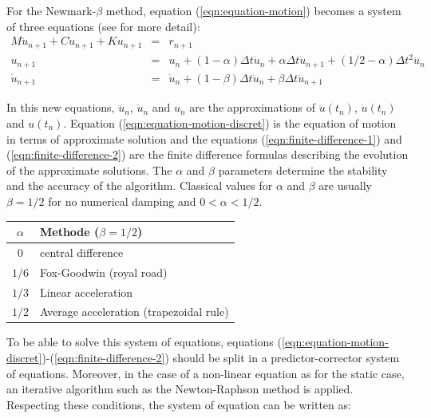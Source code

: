 \documentclass[a4paper,11pt]{book}
\begin{document}
For the  Newmark-$\beta$ method, equation  (\ref{eqn:equation-motion}) becomes a
system  of three  equations  (see \cite{curnier92a}  \cite{hughes-83a} for  more
detail):
\begin{eqnarray}
  M     \ddot{u}_{n+1}    +     C    \dot{u}_{n+1}     +    K     u_{n+1}    &=&
  r_{n+1} \label{eqn:equation-motion-discret} \\
  u_{n+1}  &=& u_{n}  + (1  - \alpha)  \Delta t  \dot{u}_{n} +  \alpha  \Delta t
  \dot{u}_{n+1}       +       (1/2        -       \alpha)       \Delta       t^2
  \ddot{u}_n \label{eqn:finite-difference-1}\\
  \dot{u}_{n+1}  &=& \dot{u}_{n} +  (1 -  \beta) \Delta  t \ddot{u}_{n}  + \beta
  \Delta t \ddot{u}_{n+1}\label{eqn:finite-difference-2}
\end{eqnarray}

In   this  new   equations,  $\ddot{u}_n$,   $\dot{u}_n$  and   $u_n$   are  the
approximations  of  $\ddot{u}(t_n)$,   $\dot{u}(t_n)$  and  $u(t_n)$.   Equation
(\ref{eqn:equation-motion-discret})  is  the  equation  of motion  in  terms  of
approximate  solution  and  the  equations  (\ref{eqn:finite-difference-1})  and
(\ref{eqn:finite-difference-2})  are the  finite difference  formulas describing
the evolution of the approximate solutions.  The $\alpha$ and $\beta$ parameters
determine the stability and the  accuracy of the algorithm. Classical values for
$\alpha$ and $\beta$ are usually $\beta = 1/2$ for no numerical damping and $0 <
\alpha < 1/2$.

\begin{center}
  \begin{tabular}{c|l}
    $\alpha$ & Methode ($\beta = 1/2$)\\
    \hline
    $0$ & central difference\\
    $1/6$ & Fox-Goodwin (royal road)\\
    $1/3$ & Linear acceleration\\
    $1/2$ & Average acceleration (trapezoidal rule)
  \end{tabular}
\end{center}

To    be    able   to    solve    this    system    of   equations,    equations
(\ref{eqn:equation-motion-discret})-(\ref{eqn:finite-difference-2})   should  be
split in a predictor-corrector system of  equations.  Moreover, in the case of a
non-linear equation as  for the static case, an iterative  algorithm such as the
Newton-Raphson method  is applied.  Respecting  these conditions, the  system of
equation can be written as:
\end{document}
